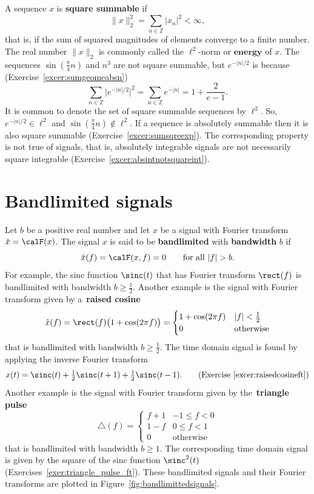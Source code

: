 \documentclass[11pt,a4paper]{book}
\theoremstyle{plain}
\numberwithin{equation}{section}
\newcommand{\ints}{{\mathbb Z}}
\newcommand{\term}{\textbf}
\newcommand{\abs}[1]{\left\vert #1 \right\vert}
\newcommand{\sabs}[1]{\vert #1 \vert}
\begin{document}
A sequence $x$ is \term{square summable} if
\[
\|x\|_2^2 = \sum_{n \in \ints} \sabs{x_n}^2 < \infty,
\]
that is, if the sum of squared magnitudes of elements converge to a finite number.  The real number $\|x\|_2$ is commonly called the $\ell^2$-norm or $\term{energy}$ of $x$.  The sequences $\sin(\tfrac{\pi}{4} n)$ and $n^3$ are not square summable, but $e^{-\abs{n}/2}$ is because (Exercise~\ref{excer:sumgeomeabsn})
\[
\sum_{n \in \ints} \sabs{e^{-\sabs{n}/2}}^2 = \sum_{n \in \ints} e^{-\abs{n}} = 1 + \frac{2}{e - 1}.
\]
It is common to denote the set of square summable sequences by $\ell^2$.  So, $e^{-\sabs{n}/2} \in \ell^2$ and $\sin(\tfrac{\pi}{4} n) \notin \ell^2$.  If a sequence is absolutely summable then it is also square summable (Exercise~\ref{excer:sumsqreexp}).  The corresponding property is not true of signals, that is, absolutely integrable signals are not necessarily square integrable (Exercise~\ref{excer:absintnotsquareint}).


\section{Bandlimited signals}\label{sec:bandlimited-signals}

Let $b$ be a positive real number and let $x$ be a signal with Fourier transform $\hat{x} = \calF(x)$.  The signal $x$ is said to be \term{bandlimited} with \term{bandwidth} $b$ if 
\[
\hat{x}(f) = \calF(x,f) = 0 \qquad \text{for all $\abs{f} > b$}.
\]  
For example, the sinc function $\sinc(t)$ that has Fourier transform $\rect(f)$ is bandlimited with bandwidth $b \geq \tfrac{1}{2}$.  Another example is the signal with Fourier transform given by a~\term{raised cosine}
\[
\hat{x}(f) = \rect(f) \big(1 + \cos( 2 \pi f )\big) = \begin{cases}
1 + \cos( 2\pi f ) & \abs{f} < \tfrac{1}{2} \\
0 & \text{otherwise}
\end{cases}
\]
that is bandlimited with bandwidth $b \geq \tfrac{1}{2}$.  The time domain signal is found by applying the inverse Fourier transform 
\[
x(t) = \sinc(t)+\tfrac{1}{2}\sinc(t+1)+\tfrac{1}{2}\sinc(t-1). \qquad \text{(Exercise~\ref{excer:raisedcosineft})}%
\]
Another example is the signal with Fourier transform given by the~\term{triangle pulse}
\[
\bigtriangleup(f) = \begin{cases}
f + 1 & -1 \leq f < 0 \\
1 - f & 0 \leq f < 1 \\
0 & \text{otherwise}
\end{cases}
\]
that is bandlimited with bandwidth $b \geq 1$.  The corresponding time domain signal is given by the square of the sinc function $\sinc^2(t)$ (Exercises~\ref{exer:triangle_pulse_ft}).  These bandlimited signals and their Fourier transforms are plotted in Figure~\ref{fig:bandlimittedsignals}.
\end{document}
